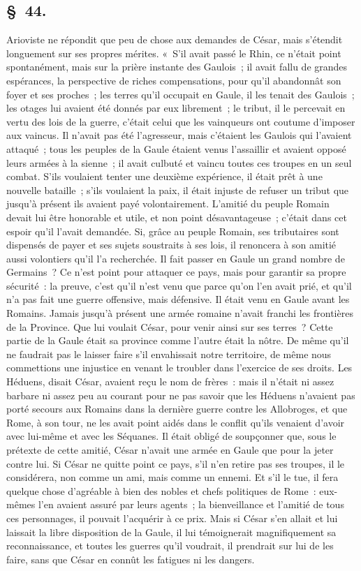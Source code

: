 \documentclass[french,twoside]{book} %
\begin{document}
\subsection[{§ 44.}]{ \textsc{§ 44.} }
\noindent Arioviste ne répondit que peu de chose aux demandes de César, mais s’étendit longuement sur ses propres mérites. « S'il avait passé le Rhin, ce n’était point spontanément, mais sur la prière instante des Gaulois ; il avait fallu de grandes espérances, la perspective de riches compensations, pour qu’il abandonnât son foyer et ses proches ; les terres qu’il occupait en Gaule, il les tenait des Gaulois ; les otages lui avaient été donnés par eux librement ; le tribut, il le percevait en vertu des lois de la guerre, c’était celui que les vainqueurs ont coutume d’imposer aux vaincus. Il n’avait pas été l’agresseur, mais c’étaient les Gaulois qui l’avaient attaqué ; tous les peuples de la Gaule étaient venus l’assaillir et avaient opposé leurs armées à la sienne ; il avait culbuté et vaincu toutes ces troupes en un seul combat. S'ils voulaient tenter une deuxième expérience, il était prêt à une nouvelle bataille ; s’ils voulaient la paix, il était injuste de refuser un tribut que jusqu’à présent ils avaient payé volontairement. L'amitié du peuple Romain devait lui être honorable et utile, et non point désavantageuse ; c’était dans cet espoir qu’il l’avait demandée. Si, grâce au peuple Romain, ses tributaires sont dispensés de payer et ses sujets soustraits à ses lois, il renoncera à son amitié aussi volontiers qu’il l’a recherchée. Il fait passer en Gaule un grand nombre de Germains ? Ce n’est point pour attaquer ce pays, mais pour garantir sa propre sécurité : la preuve, c’est qu’il n’est venu que parce qu’on l’en avait prié, et qu’il n’a pas fait une guerre offensive, mais défensive. Il était venu en Gaule avant les Romains. Jamais jusqu’à présent une armée romaine n’avait franchi les frontières de la Province. Que lui voulait César, pour venir ainsi sur ses terres ? Cette partie de la Gaule était sa province comme l’autre était la nôtre. De même qu’il ne faudrait pas le laisser faire s’il envahissait notre territoire, de même nous commettions une injustice en venant le troubler dans l’exercice de ses droits. Les Héduens, disait César, avaient reçu le nom de frères : mais il n’était ni assez barbare ni assez peu au courant pour ne pas savoir que les Héduens n’avaient pas porté secours aux Romains dans la dernière guerre contre les Allobroges, et que Rome, à son tour, ne les avait point aidés dans le conflit qu’ils venaient d’avoir avec lui-même et avec les Séquanes. Il était obligé de soupçonner que, sous le prétexte de cette amitié, César n’avait une armée en Gaule que pour la jeter contre lui. Si César ne quitte point ce pays, s’il n’en retire pas ses troupes, il le considérera, non comme un ami, mais comme un ennemi. Et s’il le tue, il fera quelque chose d’agréable à bien des nobles et chefs politiques de Rome : eux-mêmes l’en avaient assuré par leurs agents ; la bienveillance et l’amitié de tous ces personnages, il pouvait l’acquérir à ce prix. Mais si César s’en allait et lui laissait la libre disposition de la Gaule, il lui témoignerait magnifiquement sa reconnaissance, et toutes les guerres qu’il voudrait, il prendrait sur lui de les faire, sans que César en connût les fatigues ni les dangers.
\end{document}
